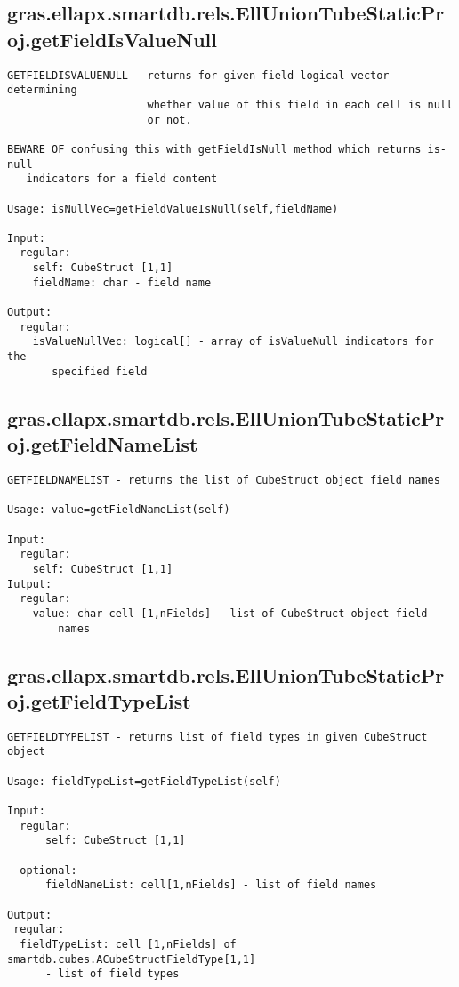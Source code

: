 \subsection{\texorpdfstring{gras.ellapx.smartdb.rels.EllUnionTubeStaticProj.getFieldIsValueNull}{getFieldIsValueNull}}\label{method:gras.ellapx.smartdb.rels.EllUnionTubeStaticProj.getFieldIsValueNull}
\begin{verbatim}
GETFIELDISVALUENULL - returns for given field logical vector determining
                      whether value of this field in each cell is null
                      or not.

BEWARE OF confusing this with getFieldIsNull method which returns is-null
   indicators for a field content

Usage: isNullVec=getFieldValueIsNull(self,fieldName)

Input:
  regular:
    self: CubeStruct [1,1]
    fieldName: char - field name

Output:
  regular:
    isValueNullVec: logical[] - array of isValueNull indicators for the
       specified field
\end{verbatim}
\subsection{\texorpdfstring{gras.ellapx.smartdb.rels.EllUnionTubeStaticProj.getFieldNameList}{getFieldNameList}}\label{method:gras.ellapx.smartdb.rels.EllUnionTubeStaticProj.getFieldNameList}
\begin{verbatim}
GETFIELDNAMELIST - returns the list of CubeStruct object field names

Usage: value=getFieldNameList(self)

Input:
  regular:
    self: CubeStruct [1,1]
Iutput:
  regular:
    value: char cell [1,nFields] - list of CubeStruct object field
        names
\end{verbatim}
\subsection{\texorpdfstring{gras.ellapx.smartdb.rels.EllUnionTubeStaticProj.getFieldTypeList}{getFieldTypeList}}\label{method:gras.ellapx.smartdb.rels.EllUnionTubeStaticProj.getFieldTypeList}
\begin{verbatim}
GETFIELDTYPELIST - returns list of field types in given CubeStruct object

Usage: fieldTypeList=getFieldTypeList(self)

Input:
  regular:
      self: CubeStruct [1,1]

  optional:
      fieldNameList: cell[1,nFields] - list of field names

Output:
 regular:
  fieldTypeList: cell [1,nFields] of smartdb.cubes.ACubeStructFieldType[1,1]
      - list of field types
\end{verbatim}
